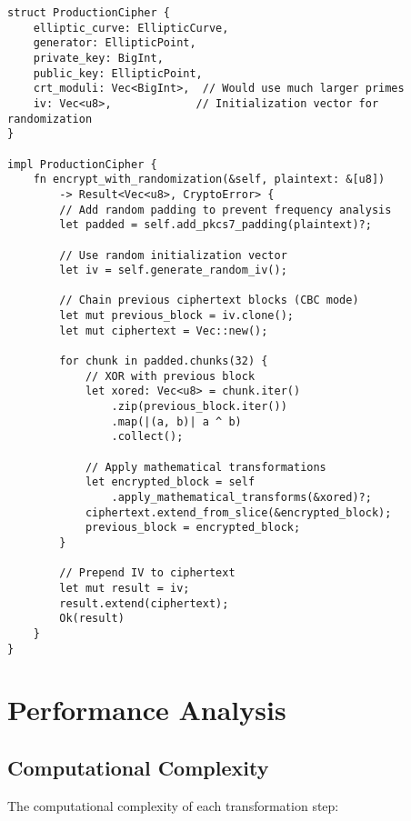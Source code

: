\documentclass[12pt,a4paper]{article}
\begin{document}
\begin{lstlisting}[caption={Production-Ready Security Enhancements}]
struct ProductionCipher {
    elliptic_curve: EllipticCurve,
    generator: EllipticPoint,
    private_key: BigInt,
    public_key: EllipticPoint,
    crt_moduli: Vec<BigInt>,  // Would use much larger primes
    iv: Vec<u8>,             // Initialization vector for randomization
}

impl ProductionCipher {
    fn encrypt_with_randomization(&self, plaintext: &[u8]) 
        -> Result<Vec<u8>, CryptoError> {
        // Add random padding to prevent frequency analysis
        let padded = self.add_pkcs7_padding(plaintext)?;
        
        // Use random initialization vector
        let iv = self.generate_random_iv();
        
        // Chain previous ciphertext blocks (CBC mode)
        let mut previous_block = iv.clone();
        let mut ciphertext = Vec::new();
        
        for chunk in padded.chunks(32) {
            // XOR with previous block
            let xored: Vec<u8> = chunk.iter()
                .zip(previous_block.iter())
                .map(|(a, b)| a ^ b)
                .collect();
            
            // Apply mathematical transformations
            let encrypted_block = self
                .apply_mathematical_transforms(&xored)?;
            ciphertext.extend_from_slice(&encrypted_block);
            previous_block = encrypted_block;
        }
        
        // Prepend IV to ciphertext
        let mut result = iv;
        result.extend(ciphertext);
        Ok(result)
    }
}
\end{lstlisting}

\section{Performance Analysis}

\subsection{Computational Complexity}

The computational complexity of each transformation step:
\end{document}

